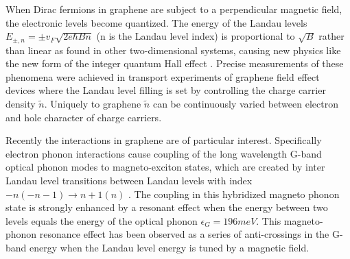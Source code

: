 \documentclass[prl,aps,superscriptaddress,reprint]{revtex4-1}
\begin{document}

\maketitle %


\label{Intro} When Dirac fermions in graphene are subject to a perpendicular magnetic field, the electronic levels become quantized. The energy of the Landau levels $E_{\pm, n}=\pm v_F\sqrt{2e\hbar Bn}$ (n is the Landau level index) is proportional to $\sqrt{B}$ rather than linear as found in other two-dimensional systems, causing new physics like the new form of the integer quantum Hall effect \cite{zhang2005experimental,novoselov2005two}. Precise measurements of these phenomena were achieved in transport experiments of graphene field effect devices where the Landau level filling is set by controlling the charge carrier density $\widetilde{n}$. Uniquely to graphene $\widetilde{n}$ can be continuously varied between electron and hole character of charge carriers.

Recently the interactions in graphene are of particular interest\cite{kotov2012electron}. Specifically electron phonon interactions cause coupling of the long wavelength G-band optical phonon modes to magneto-exciton states, which are created by inter Landau level transitions between Landau levels with index $-n(-n-1)\rightarrow n+1(n)$ \cite{goerbig2007filling}. The coupling in this hybridized magneto phonon state is strongly enhanced by a resonant effect when the energy between two levels equals the energy of the optical phonon $\epsilon_G=196meV$. This magneto-phonon resonance effect has been observed as a series of anti-crossings in the G-band energy when the Landau level energy is tuned by a magnetic field\cite{ando2007magnetic,goerbig2007filling,goerbig2011electronic}.
\end{document}
